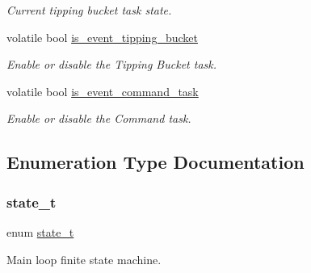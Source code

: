 \begin{DoxyCompactItemize}
\begin{DoxyCompactList}\small\item\em Current tipping bucket task state. \end{DoxyCompactList}\item 
\mbox{\label{i2c-rain_8h_a28d699d6f58eb0ef202537500dfbd464}} 
volatile bool \hyperlink{i2c-rain_8h_a28d699d6f58eb0ef202537500dfbd464}{is\+\_\+event\+\_\+tipping\+\_\+bucket}
\begin{DoxyCompactList}\small\item\em Enable or disable the Tipping Bucket task. \end{DoxyCompactList}\item 
\mbox{\label{i2c-rain_8h_a12ae2319a01786793345e264f29368a4}} 
volatile bool \hyperlink{i2c-rain_8h_a12ae2319a01786793345e264f29368a4}{is\+\_\+event\+\_\+command\+\_\+task}
\begin{DoxyCompactList}\small\item\em Enable or disable the Command task. \end{DoxyCompactList}\end{DoxyCompactItemize}


\subsection{Enumeration Type Documentation}
\mbox{\label{i2c-rain_8h_aa0aafed44fec19806d8f9ad834be1248}} 
\subsubsection{\texorpdfstring{state\+\_\+t}{state\_t}}
{\footnotesize\ttfamily enum \hyperlink{i2c-rain_8h_aa0aafed44fec19806d8f9ad834be1248}{state\+\_\+t}}



Main loop finite state machine. 

